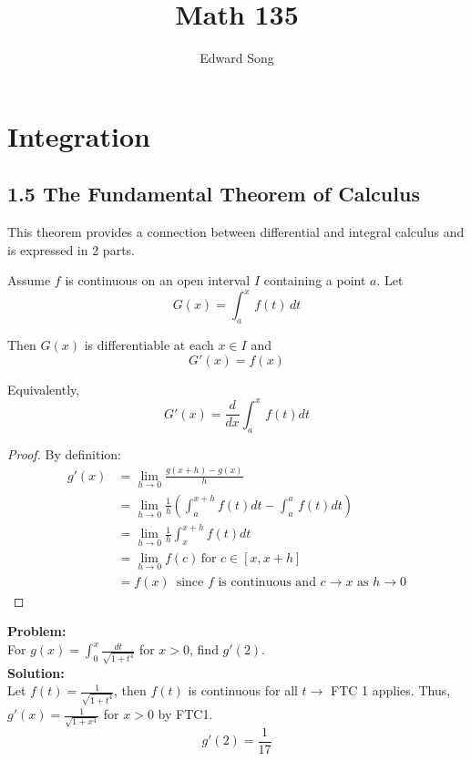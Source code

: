 \documentclass[11pt]{article}
\title{Math 135}
\author{Edward Song}
\theoremstyle{plain}
\theoremstyle{remark}
\theoremstyle{plain}
\newcommand{\bd}{\textbf}
\begin{document}
\section{Integration}


   

\subsection*{1.5  The Fundamental Theorem of Calculus }

This theorem provides a connection between differential and integral calculus 
and is expressed in 2 parts.


\begin{tcolorbox}[colback=green!5!white,colframe=green!75!black,title=Definition: FTC Part 1]
    Assume $f$ is continuous on an open interval $I$ containing a point $a$. Let 
    \[G(x) = \int_a^x \,f(t)\,dt\]

    Then $G(x)$ is differentiable at each $x\in I$ and \[G'(x) = f(x)\]
    
    Equivalently, \[G'(x) = \frac{d}{dx}\int_a^x\,f(t)dt\]
\end{tcolorbox}   

\begin{proof}
    By definition:
    \begin{align*}
        g'(x) &= \lim_{h\to 0}\frac{g(x+h)-g(x)}{h} \\
        &=\lim_{h\to 0}\frac{1}{h}(\int_a^{x+h}f(t)dt-\int_a^a\,f(t)dt) \\
        &=\lim_{h\to 0}\frac{1}{h}\int_x^{x+h}f(t)dt \\
        &=\lim_{h\to 0}f(c)\,\text{for } c\in[x,x+h] \\
        &=f(x) \, \text{ since $f$ is continuous and $c\to x$ as $h\to 0$}
    \end{align*}
\end{proof}

\begin{tcolorbox}[colback=magenta!5!white,colframe=magenta!75!black,title=Example]
    \bd{Problem:} \\For $g(x) = \int_0^x\frac{dt}{\sqrt{1+t^4}}$ for $x>0$, find $g'(2)$. \\

    \bd{Solution:} \\
    Let $f(t) = \frac{1}{\sqrt{1+t^4}}$, then $f(t)$ is continuous for all $t \rightarrow$ FTC 1 applies. Thus,
    $g'(x) = \frac{1}{\sqrt{1+x^4}}$ for $x>0$ by FTC1. \[g'(2) = \frac{1}{17}\]
\end{tcolorbox}   
\end{document}
